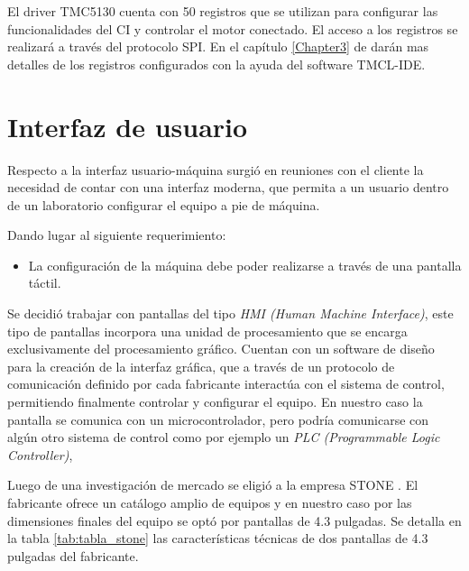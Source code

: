 El driver TMC5130 cuenta con 50 registros que se utilizan para configurar las funcionalidades del CI y controlar el motor conectado. El acceso a los registros se realizará a través del protocolo SPI. En el capítulo \ref{Chapter3} de darán mas detalles de los registros configurados con la ayuda del software TMCL-IDE.  


\section{Interfaz de usuario}

Respecto a la interfaz usuario-máquina surgió en reuniones con el cliente la necesidad de contar con una interfaz moderna, que permita a un usuario dentro de un laboratorio configurar el equipo a pie de máquina. 

Dando lugar al siguiente requerimiento:
\begin{itemize}
\item La configuración de la máquina debe poder realizarse a través de una pantalla táctil.	
\end{itemize} 

Se decidió trabajar con pantallas del tipo \textit{HMI (Human Machine Interface)}, este tipo de pantallas incorpora una unidad de procesamiento que se encarga exclusivamente del procesamiento gráfico. Cuentan con un software de diseño para la creación de la interfaz gráfica, que a través de un protocolo de comunicación definido por cada fabricante interactúa con el sistema de control, permitiendo finalmente controlar y configurar el equipo. En nuestro caso la pantalla se comunica con un microcontrolador, pero  podría  comunicarse con algún otro sistema de control como por ejemplo un  \textit{PLC (Programmable Logic Controller)}, 
 

Luego de una investigación de mercado se eligió a la empresa STONE \citep{web_stone}. El fabricante ofrece un catálogo amplio de equipos y en nuestro caso por las dimensiones finales del equipo se optó por pantallas de 4.3 pulgadas. Se detalla en la tabla \ref{tab:tabla_stone} las características técnicas de dos pantallas de 4.3 pulgadas del fabricante.

